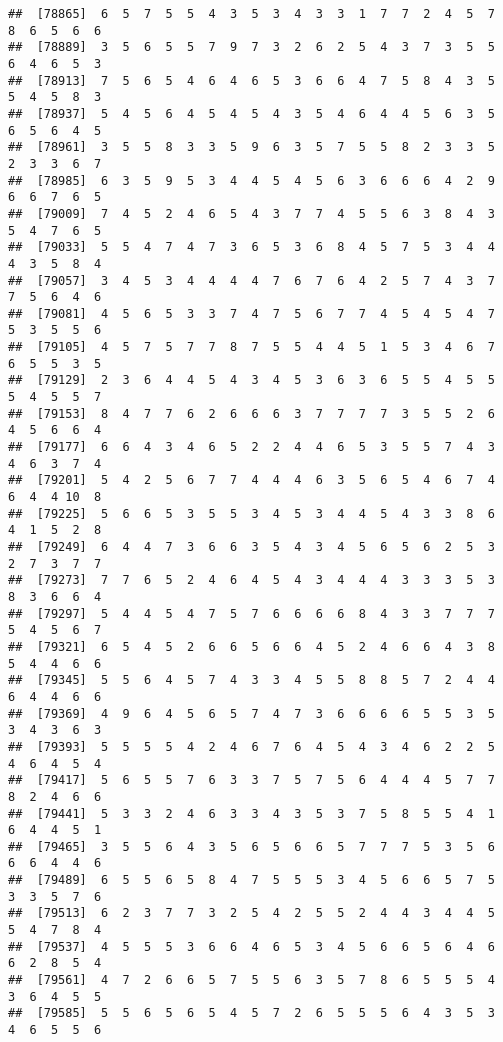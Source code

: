 \documentclass[
]{book}
\begin{document}
\begin{verbatim}
##  [78865]  6  5  7  5  5  4  3  5  3  4  3  3  1  7  7  2  4  5  7  8  6  5  6  6
##  [78889]  3  5  6  5  5  7  9  7  3  2  6  2  5  4  3  7  3  5  5  6  4  6  5  3
##  [78913]  7  5  6  5  4  6  4  6  5  3  6  6  4  7  5  8  4  3  5  5  4  5  8  3
##  [78937]  5  4  5  6  4  5  4  5  4  3  5  4  6  4  4  5  6  3  5  6  5  6  4  5
##  [78961]  3  5  5  8  3  3  5  9  6  3  5  7  5  5  8  2  3  3  5  2  3  3  6  7
##  [78985]  6  3  5  9  5  3  4  4  5  4  5  6  3  6  6  6  4  2  9  6  6  7  6  5
##  [79009]  7  4  5  2  4  6  5  4  3  7  7  4  5  5  6  3  8  4  3  5  4  7  6  5
##  [79033]  5  5  4  7  4  7  3  6  5  3  6  8  4  5  7  5  3  4  4  4  3  5  8  4
##  [79057]  3  4  5  3  4  4  4  4  7  6  7  6  4  2  5  7  4  3  7  7  5  6  4  6
##  [79081]  4  5  6  5  3  3  7  4  7  5  6  7  7  4  5  4  5  4  7  5  3  5  5  6
##  [79105]  4  5  7  5  7  7  8  7  5  5  4  4  5  1  5  3  4  6  7  6  5  5  3  5
##  [79129]  2  3  6  4  4  5  4  3  4  5  3  6  3  6  5  5  4  5  5  5  4  5  5  7
##  [79153]  8  4  7  7  6  2  6  6  6  3  7  7  7  7  3  5  5  2  6  4  5  6  6  4
##  [79177]  6  6  4  3  4  6  5  2  2  4  4  6  5  3  5  5  7  4  3  4  6  3  7  4
##  [79201]  5  4  2  5  6  7  7  4  4  4  6  3  5  6  5  4  6  7  4  6  4  4 10  8
##  [79225]  5  6  6  5  3  5  5  3  4  5  3  4  4  5  4  3  3  8  6  4  1  5  2  8
##  [79249]  6  4  4  7  3  6  6  3  5  4  3  4  5  6  5  6  2  5  3  2  7  3  7  7
##  [79273]  7  7  6  5  2  4  6  4  5  4  3  4  4  4  3  3  3  5  3  8  3  6  6  4
##  [79297]  5  4  4  5  4  7  5  7  6  6  6  6  8  4  3  3  7  7  7  5  4  5  6  7
##  [79321]  6  5  4  5  2  6  6  5  6  6  4  5  2  4  6  6  4  3  8  5  4  4  6  6
##  [79345]  5  5  6  4  5  7  4  3  3  4  5  5  8  8  5  7  2  4  4  6  4  4  6  6
##  [79369]  4  9  6  4  5  6  5  7  4  7  3  6  6  6  6  5  5  3  5  3  4  3  6  3
##  [79393]  5  5  5  5  4  2  4  6  7  6  4  5  4  3  4  6  2  2  5  4  6  4  5  4
##  [79417]  5  6  5  5  7  6  3  3  7  5  7  5  6  4  4  4  5  7  7  8  2  4  6  6
##  [79441]  5  3  3  2  4  6  3  3  4  3  5  3  7  5  8  5  5  4  1  6  4  4  5  1
##  [79465]  3  5  5  6  4  3  5  6  5  6  6  5  7  7  7  5  3  5  6  6  6  4  4  6
##  [79489]  6  5  5  6  5  8  4  7  5  5  5  3  4  5  6  6  5  7  5  3  3  5  7  6
##  [79513]  6  2  3  7  7  3  2  5  4  2  5  5  2  4  4  3  4  4  5  5  4  7  8  4
##  [79537]  4  5  5  5  3  6  6  4  6  5  3  4  5  6  6  5  6  4  6  6  2  8  5  4
##  [79561]  4  7  2  6  6  5  7  5  5  6  3  5  7  8  6  5  5  5  4  3  6  4  5  5
##  [79585]  5  5  6  5  6  5  4  5  7  2  6  5  5  5  6  4  3  5  3  4  6  5  5  6

\end{verbatim}
\end{document}
